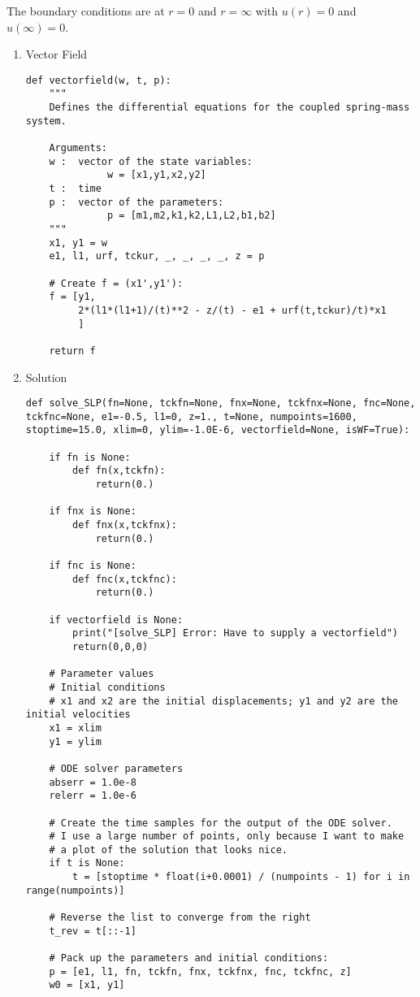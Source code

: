 \documentclass[11pt,a4paper]{article}
\begin{document}
The boundary conditions are at \(r=0\) and \(r=\infty\) with
\(u(r)=0\) and \(u(\infty)=0\).

\begin{enumerate}
\item Vector Field
\label{sec:orgec1e4ec}
\begin{verbatim}
def vectorfield(w, t, p):
    """
    Defines the differential equations for the coupled spring-mass system.

    Arguments:
    w :  vector of the state variables:
              w = [x1,y1,x2,y2]
    t :  time
    p :  vector of the parameters:
              p = [m1,m2,k1,k2,L1,L2,b1,b2]
    """
    x1, y1 = w
    e1, l1, urf, tckur, _, _, _, _, z = p

    # Create f = (x1',y1'):
    f = [y1,
         2*(l1*(l1+1)/(t)**2 - z/(t) - e1 + urf(t,tckur)/t)*x1
         ]

    return f
\end{verbatim}
\item Solution
\label{sec:org6bd2d87}
\begin{verbatim}
def solve_SLP(fn=None, tckfn=None, fnx=None, tckfnx=None, fnc=None, tckfnc=None, e1=-0.5, l1=0, z=1., t=None, numpoints=1600, stoptime=15.0, xlim=0, ylim=-1.0E-6, vectorfield=None, isWF=True):

    if fn is None:
        def fn(x,tckfn):
            return(0.)

    if fnx is None:
        def fnx(x,tckfnx):
            return(0.)

    if fnc is None:
        def fnc(x,tckfnc):
            return(0.)

    if vectorfield is None:
        print("[solve_SLP] Error: Have to supply a vectorfield")
        return(0,0,0)

    # Parameter values
    # Initial conditions
    # x1 and x2 are the initial displacements; y1 and y2 are the initial velocities
    x1 = xlim
    y1 = ylim

    # ODE solver parameters
    abserr = 1.0e-8
    relerr = 1.0e-6

    # Create the time samples for the output of the ODE solver.
    # I use a large number of points, only because I want to make
    # a plot of the solution that looks nice.
    if t is None:
        t = [stoptime * float(i+0.0001) / (numpoints - 1) for i in range(numpoints)]

    # Reverse the list to converge from the right
    t_rev = t[::-1]

    # Pack up the parameters and initial conditions:
    p = [e1, l1, fn, tckfn, fnx, tckfnx, fnc, tckfnc, z]
    w0 = [x1, y1]


\end{verbatim}
\end{enumerate}
\end{document}
